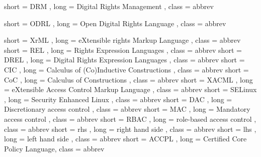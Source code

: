 {
  short = DRM ,
  long  = Digital Rights Management ,
  class = abbrev
}

{
  short = ODRL ,
  long  = Open Digital Rights Language ,
  class = abbrev
}

{
  short = XrML ,
  long  = eXtensible rights Markup Language ,
  class = abbrev
}
{
  short = REL ,
  long  = Rights Expression Languages ,
  class = abbrev
}
{
  short = DREL ,
  long  = Digital Rights Expression Languages ,
  class = abbrev
}
{
  short = CIC ,
  long  = Calculus of (Co)Inductive Constructions ,
  class = abbrev
}
{
  short = CoC ,
  long  = Calculus of Constructions ,
  class = abbrev
}
{
  short = XACML ,
  long  = eXtensible Access Control Markup Language ,
  class = abbrev
}
{
  short = SELinux ,
  long  = Security Enhanced Linux ,
  class = abbrev
}
{
  short = DAC ,
  long  = Discretionary access control ,
  class = abbrev
}
{
  short = MAC ,
  long  = Mandatory access control ,
  class = abbrev
}
{
  short = RBAC ,
  long  = role-based access control ,
  class = abbrev
}
{
  short = rhs ,
  long  = right hand side ,
  class = abbrev
}
{
  short = lhs ,
  long  = left hand side ,
  class = abbrev
}
{
  short = ACCPL ,
  long  =  Certified Core Policy Language,
  class = abbrev
}


